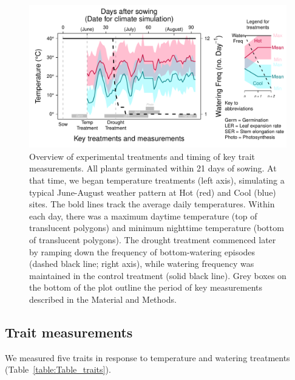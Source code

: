 \documentclass[11pt, oneside]{article}
\begin{document}

\begin{figure}[h!]
	\centerline{\includegraphics[width=1\textwidth]{Figures/Figure_ExptlDes.pdf}}
	\fontsize{10}{12}
	\selectfont
	\caption[Experimental Design]{Overview of experimental treatments and timing of key trait measurements. All plants germinated within 21 days of sowing. At that time, we began temperature treatments (left axis), simulating a typical June-August weather pattern at Hot (red) and Cool (blue) sites. The bold lines track the average daily temperatures. Within each day, there was a maximum daytime temperature (top of translucent polygons) and minimum nighttime temperature (bottom of translucent polygons). The drought treatment commenced later by ramping down the frequency of bottom-watering episodes (dashed black line; right axis), while watering frequency was maintained in the control treatment (solid black line). Grey boxes on the bottom of the plot outline the period of key measurements described in the Material and Methods.}
	\label{fig:Fig_ExptlDes}
\end{figure}

\subsection*{Trait measurements}

We measured five traits in response to temperature and watering treatments (Table~\ref{table:Table_traits}).

\end{document}
